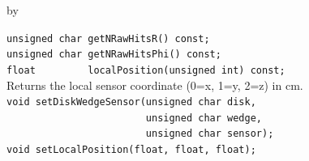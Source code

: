 \documentclass[twoside]{article}
\newcommand{\entrylabel}[1]{\mbox{\textbf{{#1}}}\hfil}%
\newenvironment{entry}
{\begin{list}{}%
    {\renewcommand{\makelabel}{\entrylabel}%
     \setlength{\labelwidth}{90pt}%
     \setlength{\leftmargin}{\labelwidth}
     \advance\leftmargin by \labelsep%
      }%
    }%
  {\end{list}}
\newcommand{\Entrylabel}[1]%
{\raisebox{0pt}[1ex][0pt]{\makebox[\labelwidth][l]%
    {\parbox[t]{\labelwidth}{\hspace{0pt}\textbf{{#1}}}}}}
\newenvironment{Entry}%
{\renewcommand{\entrylabel}{\Entrylabel}\begin{entry}}%
  {\end{entry}}
\begin{document}
\begin{Entry}
    \verb+unsigned char getNRawHitsR() const;+\\
    \verb+unsigned char getNRawHitsPhi() const;+\\
    \verb+float         localPosition(unsigned int) const;+\\
    Returns the local sensor coordinate (0=x, 1=y, 2=z) in cm.\\[2pt]
    \verb+void setDiskWedgeSensor(unsigned char disk,+\\
    \verb+                        unsigned char wedge,+\\
    \verb+                        unsigned char sensor);+\\
    \verb+void setLocalPosition(float, float, float);+\\
\end{Entry}
\clearpage
\end{document}
